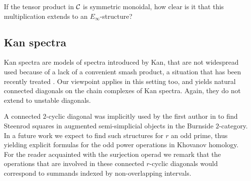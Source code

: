 If the tensor product in $\mathcal{C}$ is symmetric monoidal, how clear is it that this multiplication extends to an $E_{\infty}$-structure? 



\subsection{Kan spectra}

Kan spectra \cite{Kan1963} are models of spectra introduced by Kan, that are not widespread used because of a lack of a convenient smash product, a situation that has been recently treated \cite{CKP2023}.
Our viewpoint applies in this setting too, and yields natural connected diagonals on the chain complexes of Kan spectra.
Again, they do not extend to unstable diagonals.


A connected $2$-cyclic diagonal was implicitly used by the first author in \cite{cantero-moran2020khovanov} to find Steenrod squares in augmented semi-simplicial objects in the Burnside $2$-category.
In a future work we expect to find such structures for $r$ an odd prime, thus yielding explicit formulas for the odd power operations in Khovanov homology.
For the reader acquainted with the surjection operad we remark that the operations that are involved in these connected $r$-cyclic diagonals would correspond to summands indexed by non-overlapping intervals.

